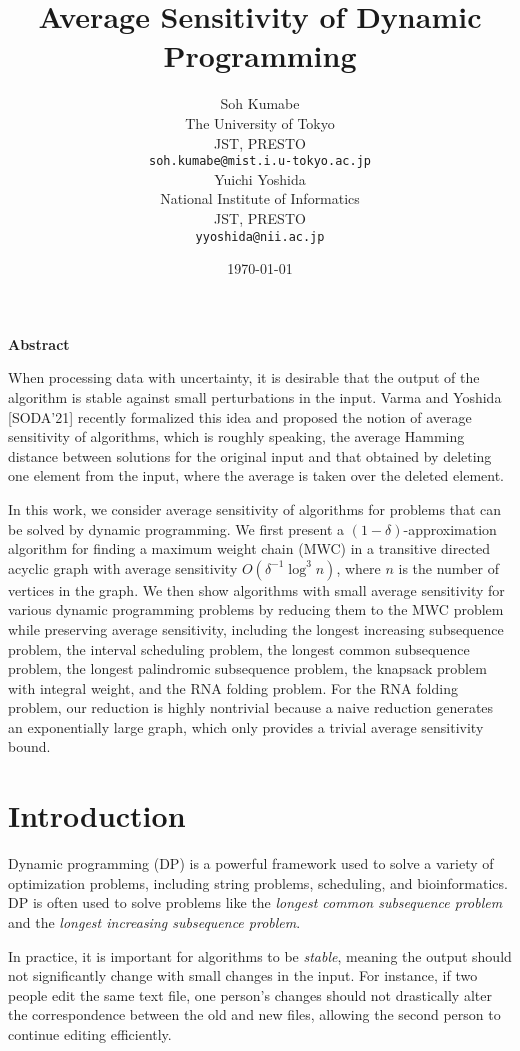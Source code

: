 \documentclass[preprint, 11pt]{article}
\title{Average Sensitivity of Dynamic Programming}
\author{
\begin{minipage}[t]{0.45\textwidth}
    \centering
    Soh Kumabe\\
    The University of Tokyo\\
    JST, PRESTO\\
    \texttt{soh.kumabe@mist.i.u-tokyo.ac.jp}
\end{minipage}
\hfill
\begin{minipage}[t]{0.45\textwidth}
    \centering
    Yuichi Yoshida\\
    National Institute of Informatics\\
    JST, PRESTO\\
    \texttt{yyoshida@nii.ac.jp}
\end{minipage}
}
\date{\today}
\begin{document}
\maketitle
\begin{center}
\textbf{Abstract}
\end{center}

When processing data with uncertainty, it is desirable that the output of the algorithm is stable against small perturbations in the input. Varma and Yoshida [SODA'21] recently formalized this idea and proposed the notion of average sensitivity of algorithms, which is roughly speaking, the average Hamming distance between solutions for the original input and that obtained by deleting one element from the input, where the average is taken over the deleted element.

In this work, we consider average sensitivity of algorithms for problems that can be solved by dynamic programming. We first present a \( (1 - \delta) \)-approximation algorithm for finding a maximum weight chain (MWC) in a transitive directed acyclic graph with average sensitivity \( O(\delta^{-1} \log^3 n) \), where \( n \) is the number of vertices in the graph. We then show algorithms with small average sensitivity for various dynamic programming problems by reducing them to the MWC problem while preserving average sensitivity, including the longest increasing subsequence problem, the interval scheduling problem, the longest common subsequence problem, the longest palindromic subsequence problem, the knapsack problem with integral weight, and the RNA folding problem. For the RNA folding problem, our reduction is highly nontrivial because a naive reduction generates an exponentially large graph, which only provides a trivial average sensitivity bound.

\section{Introduction}

Dynamic programming (DP) is a powerful framework used to solve a variety of optimization problems, including string problems, scheduling, and bioinformatics. DP is often used to solve problems like the \emph{longest common subsequence problem} and the \emph{longest increasing subsequence problem}.

In practice, it is important for algorithms to be \emph{stable}, meaning the output should not significantly change with small changes in the input. For instance, if two people edit the same text file, one person’s changes should not drastically alter the correspondence between the old and new files, allowing the second person to continue editing efficiently.
\end{document}

